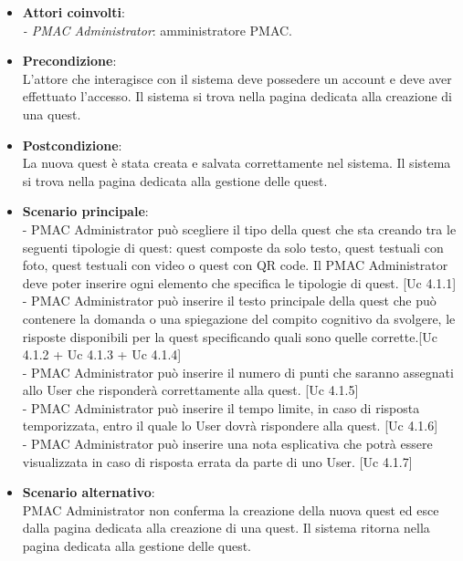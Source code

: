 \documentclass[10pt,a4paper]{article}
\begin{document}
\begin{itemize}
\item \textbf{Attori coinvolti}:\\
\emph{- PMAC Administrator}: amministratore PMAC.

\item \textbf{Precondizione}:\\
L'attore che interagisce con il sistema deve possedere un account e deve aver effettuato l'accesso. Il sistema si trova nella pagina dedicata alla creazione di una quest. 

\item \textbf{Postcondizione}:\\
La nuova quest è stata creata e salvata correttamente nel sistema. Il sistema si trova nella pagina dedicata alla gestione delle quest.

\item \textbf{Scenario principale}:\\
- PMAC Administrator può scegliere il tipo della quest che sta creando tra le seguenti tipologie di quest: quest composte da solo testo, quest testuali con foto, quest testuali con video o quest con QR code. Il PMAC Administrator deve poter inserire ogni elemento che specifica le tipologie di quest. [Uc 4.1.1]\\
- PMAC Administrator può inserire il testo principale della quest che può contenere la domanda o una spiegazione del compito cognitivo da svolgere, le risposte disponibili per la quest specificando quali sono quelle corrette.[Uc 4.1.2 + Uc 4.1.3 + Uc 4.1.4]\\
- PMAC Administrator può inserire il numero di punti che saranno assegnati allo User che risponderà correttamente alla quest. [Uc 4.1.5]\\
- PMAC Administrator può inserire il tempo limite, in caso di risposta temporizzata, entro il quale lo User dovrà rispondere alla quest. [Uc 4.1.6]\\
- PMAC Administrator può inserire una nota esplicativa che potrà essere visualizzata in caso di risposta errata da parte di uno User. [Uc 4.1.7]

\item \textbf{Scenario alternativo}:\\
PMAC Administrator non conferma la creazione della nuova quest ed esce dalla pagina dedicata alla creazione di una quest. Il sistema ritorna nella pagina dedicata alla gestione delle quest.
\end{itemize}
\end{document}

